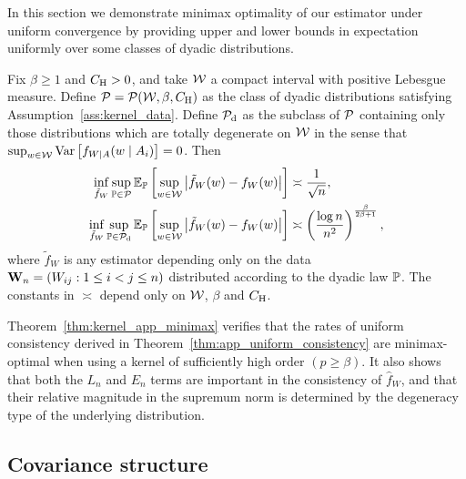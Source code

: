 In this section we demonstrate
minimax optimality of our estimator under uniform convergence
by providing upper and lower bounds in expectation uniformly over
some classes of dyadic distributions.
\begin{theorem}
  \label{thm:kernel_app_minimax}

  Fix $\beta \geq 1$ and $\CH > 0$,
  and take $\cW$ a compact interval with
  positive Lebesgue measure.
  Define $\cP = \cP(\cW, \beta, \CH)$
  as the class of dyadic distributions
  satisfying Assumption~\ref{ass:kernel_data}.
  Define $\cPd$ as the subclass of $\cP$
  containing only those distributions
  which are totally degenerate on $\cW$ in the sense that
  $\sup_{w \in \cW} \Var\left[f_{W \mid A}(w \mid A_i)\right] = 0$.
  Then
  \begin{align*}
    \inf_{\tilde f_W}
    \sup_{\P \in \cP}
    \E_\P\left[
      \sup_{w \in \cW}
      \big|
      \tilde f_W(w) - f_W(w)
      \big|
    \right]
    &\asymp
    \frac{1}{\sqrt n}, \\
    \inf_{\tilde f_W}
    \sup_{\P \in \cPd}
    \E_\P\left[
      \sup_{w \in \cW}
      \big|
      \tilde f_W(w) - f_W(w)
      \big|
    \right]
    &\asymp
    \left(
      \frac{\log n}{n^2}
    \right)^{\frac{\beta}{2\beta+1}},
  \end{align*}
  where $\tilde f_W$ is any estimator depending only on
  the data $\bW_n = (W_{i j}: 1 \leq i < j \leq n)$
  distributed according to the dyadic law $\P$.
  The constants in $\asymp$ depend only on
  $\cW$, $\beta$ and $\CH$.

\end{theorem}

\begin{remark}

  Theorem~\ref{thm:kernel_app_minimax}
  verifies that the rates of uniform consistency derived
  in Theorem~\ref{thm:app_uniform_consistency}
  are minimax-optimal when using a kernel of sufficiently high order
  $(p \geq \beta)$.
  It also shows that both the
  $L_n$ and $E_n$ terms are important
  in the consistency of $\hat f_W$,
  and that their relative magnitude
  in the supremum norm is determined
  by the degeneracy type of the underlying distribution.

\end{remark}

\subsection{Covariance structure}

